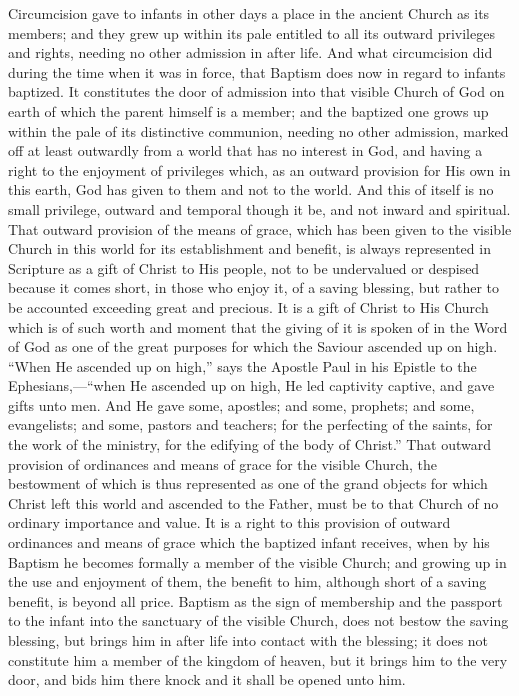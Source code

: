 \documentclass[]{book}
\begin{document}
Circumcision gave to infants in other days a place in the ancient Church as its members; and they grew up within its pale entitled to all its outward privileges and rights, needing no other admission in after life. And what circumcision did during the time when it was in force, that Baptism does now in regard to infants baptized. It constitutes the door of admission into that visible Church of God on earth of which the parent himself is a member; and the baptized one grows up within the pale of its distinctive communion, needing no other admission, marked off at least outwardly from a world that has no interest in God, and having a right to the enjoyment of privileges which, as an outward provision for His own in this earth, God has given to them and not to the world. And this of itself is no small privilege, outward and temporal though it be, and not inward and spiritual. That outward provision of the means of grace, which has been given to the visible Church in this world for its establishment and benefit, is always represented in Scripture as a gift of Christ to His people, not to be undervalued or despised because it comes short, in those who enjoy it, of a saving blessing, but rather to be accounted exceeding great and precious. It is a gift of Christ to His Church which is of such worth and moment that the giving of it is spoken of in the Word of God as one of the great purposes for which the Saviour ascended up on high. ``When He ascended up on high,'' says the Apostle Paul in his Epistle to the Ephesians,---``when He ascended up on high, He led captivity captive, and gave gifts unto men. And He gave some, apostles; and some, prophets; and some, evangelists; and some, pastors and teachers; for the perfecting of the saints, for the work of the ministry, for the edifying of the body of Christ.'' That outward provision of ordinances and means of grace for the visible Church, the bestowment of which is thus represented as one of the grand objects for which Christ left this world and ascended to the Father, must be to that Church of no ordinary importance and value. It is a right to this provision of outward ordinances and means of grace which the baptized infant receives, when by his Baptism he becomes formally a member of the visible Church; and growing up in the use and enjoyment of them, the benefit to him, although short of a saving benefit, is beyond all price. Baptism as the sign of membership and the passport to the infant into the sanctuary of the visible Church, does not bestow the saving blessing, but brings him in after life into contact with the blessing; it does not constitute him a member of the kingdom of heaven, but it brings him to the very door, and bids him there knock and it shall be opened unto him.
\end{document}
